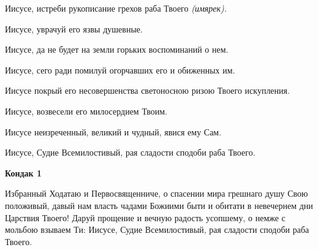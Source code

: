 Иисусе, истреби рукописание грехов раба Твоего \itshape (имярек)\normalfont{}. 


Иисусе, уврачуй его язвы душевные. 


Иисусе, да не будет на земли горьких воспоминаний о нем. 


Иисусе, сего ради помилуй огорчавших его и обиженных им. 


Иисусе покрый его несовершенства светоносною ризою Твоего искупления. 


Иисусе, возвесели его милосердием Твоим. 


Иисусе неизреченный, великий и чудный, явися ему Сам. 


Иисусе, Судие Всемилостивый, рая сладости сподоби раба Твоего.




\bfseries Кондак 1 \normalfont{}


Избранный Ходатаю и Первосвященниче, о спасении мира грешнаго душу Свою положивый, давый нам власть чадами Божиими быти и обитати в невечернем дни Царствия Твоего! Даруй прощение и вечную радость усопшему, о немже с мольбою взываем Ти: Иисусе, Судие Всемилостивый, рая сладости сподоби раба Твоего.


\mychapterending

 


